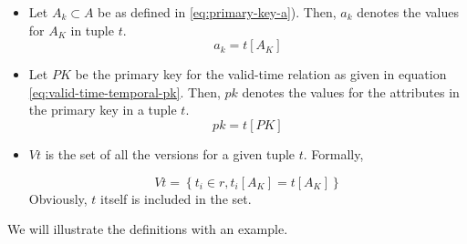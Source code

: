 \begin{definition}
\begin{itemize}
      \item Let $A_k \subset A$ be as defined in \eqref{eq:primary-key-a}). Then, $a_k$ denotes the values for $A_K$ in tuple $t$.
	    \begin{equation}
	     \label{eq:pk-attribute} 
	      a_k = t\left[A_K \right]
	    \end{equation}

    \item Let $PK$ be the primary key for the valid-time relation as given in equation \eqref{eq:valid-time-temporal-pk}. Then, $pk$ denotes the values for the attributes in the primary key in a tuple $t$.
	  \begin{equation}
	   \label{eq:value-pk}
	  pk = t\left[PK \right]
	  \end{equation}


\item $Vt$ is the set of all the versions for a given tuple $t$. Formally,

\begin{equation}
 \label{eq:all-the-versions}
Vt =\left \lbrace t_i \in r, t_i\left[A_K\right] = t\left[A_K\right] \right \rbrace
\end{equation}
Obviously, $t$ itself is included in the set.
\end{itemize}
\end{definition}
We will illustrate the definitions with an example.

